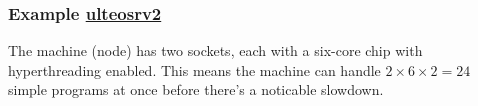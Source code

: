 \documentclass[hyperref,pdfa,unicode,utf8,usepdftitle]{beamer}
\begin{document}
\begin{frame}
  \frametitle{Example \url{ulteosrv2}}
  \begin{tikzpicture}
    
  \end{tikzpicture}
  The machine (node) has two sockets, each with a six-core chip with
  hyperthreading enabled.  This means the machine can handle
  \(2 \times 6 \times 2 = 24 \) simple programs at once before there's
  a noticable slowdown.
\end{frame}
\end{document}
